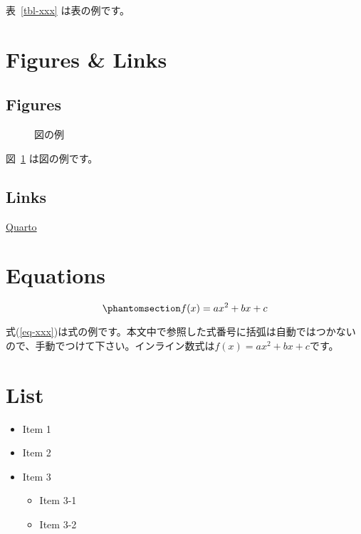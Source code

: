 \documentclass[
  japanese,
  letterpaper,
  lualatex,
  ja=standard,
  10pt,
  a4paper,
  textwidth-limit=50,
  openany]{bxjsbook}
\providecommand{\tightlist}{%
  \setlength{\itemsep}{0pt}\setlength{\parskip}{0pt}}
\begin{document}
表~\ref{tbl-xxx} は表の例です。

\section{Figures \& Links}\label{figures-links}

\subsection{Figures}\label{figures}

\begin{figure}[H]


\caption{\label{fig-xxx}図の例}

\end{figure}%

図~\ref{fig-xxx} は図の例です。

\subsection{Links}\label{links}

\href{https://quarto.org}{Quarto}

\section{Equations}\label{equations}

\begin{equation}\phantomsection\label{eq-xxx}{
  f(x) = ax^2 + bx + c
}\end{equation}

式(\ref{eq-xxx})は式の例です。本文中で参照した式番号に括弧は自動ではつかないので、手動でつけて下さい。インライン数式は\(f(x) = ax^2 + bx + c\)です。

\section{List}\label{list}

\begin{itemize}
\tightlist
\item
  Item 1
\item
  Item 2
\item
  Item 3

  \begin{itemize}
  \tightlist
  \item
    Item 3-1
  \item
    Item 3-2
  \end{itemize}
\end{itemize}
\end{document}
